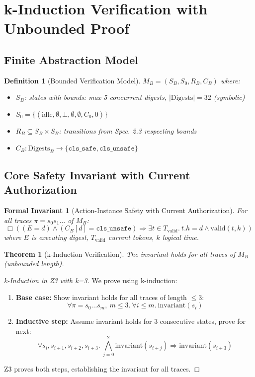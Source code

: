\documentclass[12pt]{article}
\newtheorem{definition}{Definition}[section]
\newtheorem{invariant}{Formal Invariant}[section]
\newtheorem{theorem}{Theorem}[section]
\begin{document}
\section{k-Induction Verification with Unbounded Proof}

\subsection{Finite Abstraction Model}

\begin{definition}[Bounded Verification Model]
$M_B = (S_B, S_0, R_B, C_B)$ where:
\begin{itemize}
    \item $S_B$: states with bounds: max 5 concurrent digests, $|\mathrm{Digests}| = 32$ (symbolic)
    \item $S_0 = \{(\text{idle}, \emptyset, \bot, \emptyset, \emptyset, C_0, 0)\}$
    \item $R_B \subseteq S_B \times S_B$: transitions from Spec. 2.3 respecting bounds
    \item $C_B: \mathrm{Digests}_B \to \{\texttt{cls\_safe}, \texttt{cls\_unsafe}\}$
\end{itemize}
\end{definition}

\subsection{Core Safety Invariant with Current Authorization}

\begin{invariant}[Action-Instance Safety with Current Authorization]
For all traces $\pi = s_0 s_1 \dots$ of $M_B$:
\[
\Box\left((E = d) \land (C_B[d] = \texttt{cls\_unsafe}) \Rightarrow \exists t \in T_{\text{valid}}.\ t.h = d \land \text{valid}(t,k)\right)
\]
where $E$ is executing digest, $T_{\text{valid}}$ current tokens, $k$ logical time.
\end{invariant}

\begin{theorem}[k-Induction Verification]
The invariant holds for all traces of $M_B$ (unbounded length).
\end{theorem}

\begin{proof}[k-Induction in Z3 with k=3]
We prove using k-induction:
\begin{enumerate}
    \item \textbf{Base case:} Show invariant holds for all traces of length $\leq 3$:
    \[
    \forall \pi = s_0 \dots s_m,\ m \leq 3.\ \forall i \leq m.\ \text{invariant}(s_i)
    \]
    \item \textbf{Inductive step:} Assume invariant holds for 3 consecutive states, prove for next:
    \[
    \forall s_{i}, s_{i+1}, s_{i+2}, s_{i+3}.\ \bigwedge_{j=0}^{2} \text{invariant}(s_{i+j}) \Rightarrow \text{invariant}(s_{i+3})
    \]
\end{enumerate}
Z3 proves both steps, establishing the invariant for all traces.
\end{proof}
\end{document}
